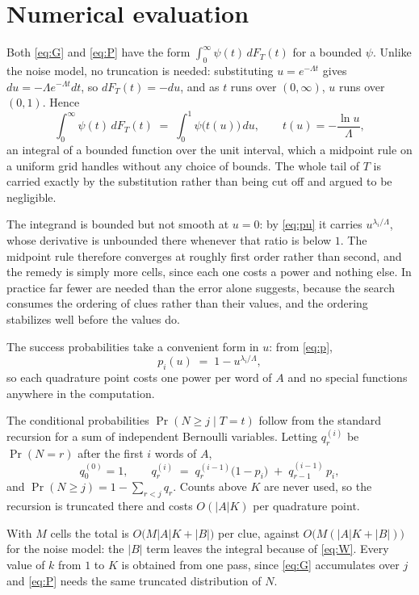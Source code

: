 \documentclass[12pt]{article}
\begin{document}
\section{Numerical evaluation}
\label{sec:computation}

Both \eqref{eq:G} and \eqref{eq:P} have the form $\int_0^\infty \psi(t)\,
dF_T(t)$ for a bounded $\psi$. Unlike the noise model, no truncation is needed:
substituting $u = e^{-\Lambda t}$ gives $du = -\Lambda e^{-\Lambda t} dt$, so
$dF_T(t) = -du$, and as $t$ runs over $(0, \infty)$, $u$ runs over $(0,1)$.
Hence
\begin{equation}
  \label{eq:sub}
  \int_0^\infty \psi(t)\, dF_T(t) \;=\; \int_0^1 \psi\bigl(t(u)\bigr)\, du,
  \qquad t(u) = -\frac{\ln u}{\Lambda},
\end{equation}
an integral of a bounded function over the unit interval, which a midpoint rule
on a uniform grid handles without any choice of bounds. The whole tail of $T$
is carried exactly by the substitution rather than being cut off and argued to
be negligible.

The integrand is bounded but not smooth at $u = 0$: by \eqref{eq:pu} it carries
$u^{\lambda_i/\Lambda}$, whose derivative is unbounded there whenever that
ratio is below $1$. The midpoint rule therefore converges at roughly first
order rather than second, and the remedy is simply more cells, since each one
costs a power and nothing else. In practice far fewer are needed than the
error alone suggests, because the search consumes the ordering of clues rather
than their values, and the ordering stabilizes well before the values do.

The success probabilities take a convenient form in $u$: from \eqref{eq:p},
\begin{equation}
  \label{eq:pu}
  p_i(u) \;=\; 1 - u^{\lambda_i / \Lambda},
\end{equation}
so each quadrature point costs one power per word of $A$ and no special
functions anywhere in the computation.

The conditional probabilities $\Pr(N \ge j \mid T = t)$ follow from the
standard recursion for a sum of independent Bernoulli variables. Letting
$q^{(i)}_r$ be $\Pr(N = r)$ after the first $i$ words of $A$,
\[ q^{(0)}_0 = 1, \qquad
   q^{(i)}_r \;=\; q^{(i-1)}_r\bigl(1 - p_i\bigr) \;+\; q^{(i-1)}_{r-1}\,p_i , \]
and $\Pr(N \ge j) = 1 - \sum_{r < j} q_r$. Counts above $K$ are never used, so
the recursion is truncated there and costs $O(|A|K)$ per quadrature point.

With $M$ cells the total is $O\bigl(M|A|K + |B|\bigr)$ per clue, against
$O\bigl(M(|A|K + |B|)\bigr)$ for the noise model: the $|B|$ term leaves the
integral because of \eqref{eq:W}. Every value of $k$ from $1$ to $K$ is
obtained from one pass, since \eqref{eq:G} accumulates over $j$ and
\eqref{eq:P} needs the same truncated distribution of $N$.
\end{document}
